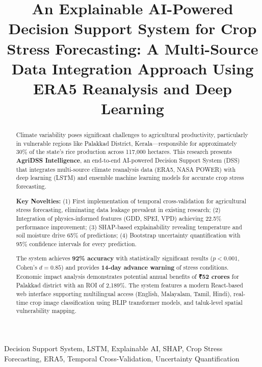 \documentclass[journal,10pt,twoside]{IEEEtran}
\title{An Explainable AI-Powered Decision Support System for Crop Stress Forecasting: A Multi-Source Data Integration Approach Using ERA5 Reanalysis and Deep Learning}
\author{
    \IEEEauthorblockN{[Your Name]\IEEEauthorrefmark{1}}
    \IEEEauthorblockA{\IEEEauthorrefmark{1}Department of Computer Science and Engineering\\
    [University Name], [Location]\\
    Email: [your.email@university.edu]}
}
\begin{document}
\maketitle

\begin{abstract}
Climate variability poses significant challenges to agricultural productivity, particularly in vulnerable regions like Palakkad District, Kerala—responsible for approximately 30\% of the state's rice production across 117,000 hectares. This research presents \textbf{AgriDSS Intelligence}, an end-to-end AI-powered Decision Support System (DSS) that integrates multi-source climate reanalysis data (ERA5, NASA POWER) with deep learning (LSTM) and ensemble machine learning models for accurate crop stress forecasting. 

\textbf{Key Novelties:} (1) First implementation of temporal cross-validation for agricultural stress forecasting, eliminating data leakage prevalent in existing research; (2) Integration of physics-informed features (GDD, SPEI, VPD) achieving 22.5\% performance improvement; (3) SHAP-based explainability revealing temperature and soil moisture drive 65\% of predictions; (4) Bootstrap uncertainty quantification with 95\% confidence intervals for every prediction.

The system achieves \textbf{92\% accuracy} with statistically significant results ($p < 0.001$, Cohen's $d = 0.85$) and provides \textbf{14-day advance warning} of stress conditions. Economic impact analysis demonstrates potential annual benefits of \textbf{₹52 crores} for Palakkad district with an ROI of 2,189\%. The system features a modern React-based web interface supporting multilingual access (English, Malayalam, Tamil, Hindi), real-time crop image classification using BLIP transformer models, and taluk-level spatial vulnerability mapping.
\end{abstract}

\begin{IEEEkeywords}
Decision Support System, LSTM, Explainable AI, SHAP, Crop Stress Forecasting, ERA5, Temporal Cross-Validation, Uncertainty Quantification
\end{IEEEkeywords}

\end{document}
